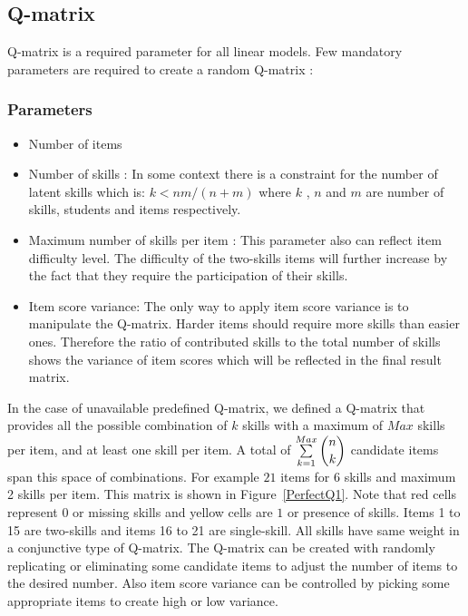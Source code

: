 \subsection{Q-matrix}
\label{Q-MatrixObtain}
Q-matrix is a required parameter for all linear models. Few mandatory parameters are required to create a random Q-matrix :

\subsubsection{Parameters}
\begin{itemize}
\item Number of items 
\item Number of skills : In some context there is a constraint for the number of latent skills which is: $k<nm/(n+m)$ \protect\citep{lee1999learning} where $k$ , $n$ and $m$ are number of skills, students and items respectively.
\item Maximum number of skills per item : This parameter also can reflect item difficulty level. The difficulty of  the two-skills items will further increase by the fact that they require the participation of their skills.
\item Item score variance: The only way to apply item score variance is to manipulate the Q-matrix. Harder items should require more skills than easier ones. Therefore the ratio of contributed skills to the total number of skills shows the variance of item scores which will be reflected in the final result matrix.

\end{itemize}

In the case of unavailable predefined Q-matrix, we defined a Q-matrix that provides all the possible combination of $k$ skills with a maximum of $Max$ skills per item, and at least one skill per item. A total of $\sum\limits_{k=1}^{Max} \dbinom{n}{k}$ candidate items span this space of combinations. For example $21$ items for 6 skills and maximum 2 skills per item. This matrix is shown in Figure~\ref{PerfectQ1}. Note that red cells represent $0$ or missing skills and yellow cells are $1$ or presence of skills. Items 1 to 15 are two-skills and items 16 to 21 are single-skill. All skills have same weight in a conjunctive type of Q-matrix. The Q-matrix can be created with randomly replicating or eliminating some candidate items to adjust the number of items to the desired number. Also item score variance can be controlled by picking some appropriate items to create high or low variance.

